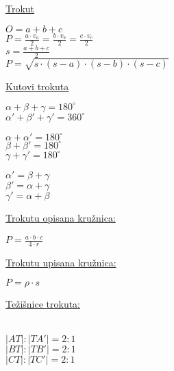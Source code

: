 \documentclass[9pt,oneside,a4paper]{report}
\begin{document}
\vspace{3mm}
\noindent
\begin{minipage}[t]{60mm}
	\underline{Trokut}\\

	$O=a+b+c$\\
	$\displaystyle P=\frac{a\cdot v_a}2=\frac{b\cdot v_b}2=\frac{c\cdot v_c}2$\\
	$\displaystyle s=\frac{a+b+c}2$\\
	$\displaystyle P=\sqrt{s\cdot (s-a)\cdot (s-b)\cdot (s-c)}$
\end{minipage}
\begin{minipage}[t]{60mm}
	\underline{Kutovi trokuta}\\

	\vspace{4mm}
	$\alpha+\beta+\gamma=180^\circ$\\
	$\alpha'+\beta'+\gamma'=360^\circ$
\end{minipage}
\begin{minipage}[t]{50mm}
	\vspace*{17mm}
	$\alpha+\alpha'=180^\circ$\\
	$\beta+\beta'=180^\circ$\\
	$\gamma+\gamma'=180^\circ$

	\vspace{3mm}
	\noindent
	$\alpha'=\beta+\gamma$\\
	$\beta'=\alpha+\gamma$\\
	$\gamma'=\alpha+\beta$
\end{minipage}

\vspace{3mm}
\noindent
\begin{minipage}[t]{55mm}
	\noindent
	\underline{Trokutu opisana kru\v{z}nica:}


	\noindent
	$\displaystyle P=\frac{a\cdot b\cdot c}{4\cdot r}$
\end{minipage}
\begin{minipage}[t]{60mm}
	\underline{Trokutu upisana kru\v{z}nica:}

	\noindent

	\noindent
	$\displaystyle P=\rho\cdot s$
\end{minipage}
\begin{minipage}[t]{55mm}
	\underline{Te\v{z}i\v{s}nice trokuta:}

	\\
	$|AT|:|TA'|=2:1$\\
	$|BT|:|TB'|=2:1$\\
	$|CT|:|TC'|=2:1$
\end{minipage}
\end{document}
